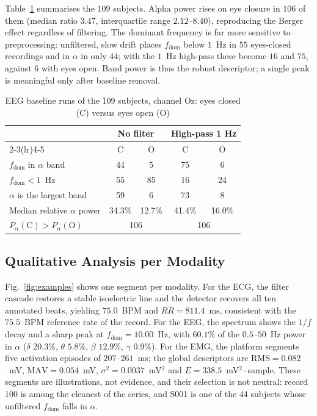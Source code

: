 \documentclass[conference]{IEEEtran}
\begin{document}
Table~\ref{tab:eegpop} summarises the $109$ subjects. Alpha power rises on eye closure in $106$ of them (median ratio $3.47$, interquartile range $2.12$--$8.40$), reproducing the Berger effect regardless of filtering. The dominant frequency is far more sensitive to preprocessing: unfiltered, slow drift places $f_{\mathrm{dom}}$ below $1$~Hz in $55$ eyes-closed recordings and in $\alpha$ in only $44$; with the $1$~Hz high-pass these become $16$ and $75$, against $6$ with eyes open. Band power is thus the robust descriptor; a single peak is meaningful only after baseline removal.

\begin{table}[!t]
\caption{EEG baseline runs of the 109 subjects, channel Oz: eyes closed (C) versus eyes open (O)}
\centering
\renewcommand{\arraystretch}{1.12}
\setlength{\tabcolsep}{5pt}
\begin{tabular}{lcccc}
\toprule
& \multicolumn{2}{c}{\textbf{No filter}} & \multicolumn{2}{c}{\textbf{High-pass 1 Hz}}\\
\cmidrule(lr){2-3}\cmidrule(lr){4-5}
& C & O & C & O\\
\midrule
$f_{\mathrm{dom}}$ in $\alpha$ band & 44 & 5 & 75 & 6\\
$f_{\mathrm{dom}}<1$~Hz & 55 & 85 & 16 & 24\\
$\alpha$ is the largest band & 59 & 6 & 73 & 8\\
Median relative $\alpha$ power & 34.3\% & 12.7\% & 41.4\% & 16.0\%\\
$P_\alpha(\mathrm{C})>P_\alpha(\mathrm{O})$ & \multicolumn{2}{c}{106} & \multicolumn{2}{c}{106}\\
\bottomrule
\end{tabular}
\label{tab:eegpop}
\end{table}

\subsection{Qualitative Analysis per Modality}
\label{sec:results-qual}

Fig.~\ref{fig:examples} shows one segment per modality. For the ECG, the filter cascade restores a stable isoelectric line and the detector recovers all ten annotated beats, yielding $75.0$~BPM and $\overline{RR}=811.4$~ms, consistent with the $75.5$~BPM reference rate of the record. For the EEG, the spectrum shows the $1/f$ decay and a sharp peak at $f_{\mathrm{dom}}=10.00$~Hz, with $60.1\%$ of the $0.5$--$50$~Hz power in $\alpha$ ($\delta$ $20.3\%$, $\theta$ $5.8\%$, $\beta$ $12.9\%$, $\gamma$ $0.9\%$). For the EMG, the platform segments five activation episodes of $207$--$261$~ms; the global descriptors are $\mathrm{RMS}=0.082$~mV, $\mathrm{MAV}=0.054$~mV, $\sigma^{2}=0.0037$~mV$^{2}$ and $E=338.5$~mV$^{2}\cdot$sample. These segments are illustrations, not evidence, and their selection is not neutral: record 100 is among the cleanest of the series, and S001 is one of the $44$ subjects whose unfiltered $f_{\mathrm{dom}}$ falls in $\alpha$.
\end{document}
